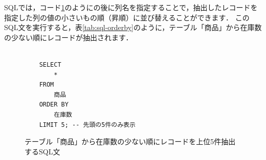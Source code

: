 SQLでは，コード\ref{code:sql-orderby}のようにの後に列名を指定することで，抽出したレコードを指定した列の値の小さいもの順（昇順）に並び替えることができます．
このSQL文を実行すると，表\ref{tab:sql-orderby}のように，テーブル「商品」から在庫数の少ない順にレコードが抽出されます．
\begin{figure}[!htbp]
    \begin{verbatim}

    SELECT
        *
    FROM
        商品
    ORDER BY
        在庫数
    LIMIT 5; -- 先頭の5件のみ表示

    \end{verbatim}
    \captionsetup{name=コード}
    \caption{テーブル「商品」から在庫数の少ない順にレコードを上位5件抽出するSQL文}
    \label{code:sql-orderby}
\end{figure}
\begin{table}[!htbp]
    \centering
    \caption{テーブル「商品」から在庫数の少ない順にレコードを抽出した結果（上位5件）}
    \label{tab:sql-orderby}
\end{table}

